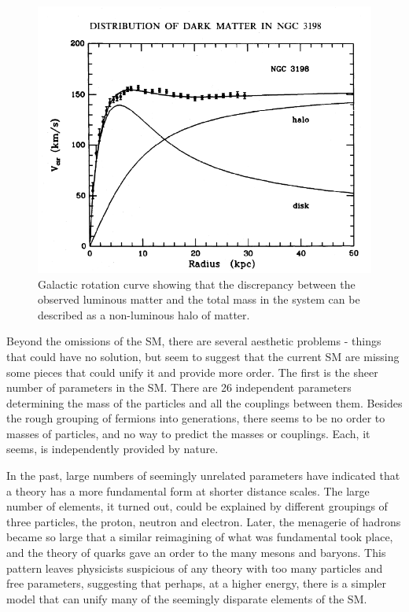 \begin{centering}
\begin{figure}[bth]
\myfloatalign
\includegraphics[width=.85\linewidth]{figures/theory/rotatioanl_curve_ngc3198_rc.png}
\caption{Galactic rotation curve showing that the discrepancy between the observed luminous matter and the total mass in the system can be described as a non-luminous halo of matter. \cite{1985ApJ...295..305V}}
\label{fig:dm_curve}
\end{figure}
\end{centering}

Beyond the omissions of the \ac{SM}, there are several aesthetic problems - things that could have no solution, but seem to suggest that the current \ac{SM} are missing some pieces that could unify it and provide more order. The first is the sheer number of parameters in the \ac{SM}. There are 26 independent parameters determining the mass of the particles and all the couplings between them. Besides the rough grouping of fermions into generations, there seems to be no order to masses of particles, and no way to predict the masses or couplings. Each, it seems, is independently provided by nature. 

In the past, large numbers of seemingly unrelated parameters have indicated that a theory has a more fundamental form at shorter distance scales. The large number of elements, it turned out, could be explained by different groupings of three particles, the proton, neutron and electron. Later, the menagerie of hadrons became so large that a similar reimagining of what was fundamental took place, and the theory of quarks gave an order to the many mesons and baryons. This pattern leaves physicists suspicious of any theory with too many particles and free parameters, suggesting that perhaps, at a higher energy, there is a simpler model that can unify many of the seemingly disparate elements of the \ac{SM}. 

